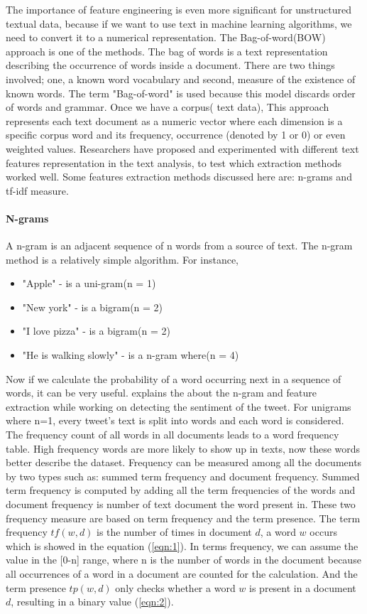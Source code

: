 The importance of feature engineering is even more significant for unstructured textual data, because if we want to use text in machine learning algorithms, we need to convert it to a numerical representation. The Bag-of-word(BOW) approach is one of the methods. The bag of words is a text representation describing the occurrence of words inside a document. There are two things involved; one, a known word vocabulary and second, measure of the existence of known words. The term "Bag-of-word" is used because this model discards order of words and grammar.  Once we have a corpus( text data), This approach represents each text document as a numeric vector where each dimension is a specific corpus word and its frequency, occurrence (denoted by 1 or 0) or even weighted values. Researchers have proposed and experimented with different text features representation in the text analysis, to test which extraction methods worked well. Some features extraction methods discussed here are:  n-grams and tf-idf measure.

\paragraph{N-grams} 


A n-gram is an adjacent sequence of n words from a source of text. The n-gram method is a relatively simple algorithm. For instance, 
\begin{itemize}
  \item "Apple" - is a uni-gram(n = 1)
  \item "New york" - is a bigram(n = 2)
  \item "I love pizza" - is a bigram(n = 2)
  \item "He is walking slowly" - is a n-gram where(n = 4)
\end{itemize}
Now if we calculate the probability of a word occurring next in a sequence of words, it can be very useful. \cite{groot2012data} explains the about the n-gram and feature extraction while working on detecting the sentiment of the tweet. For unigrams where n=1, every tweet's text is split into words and each word is considered. The frequency count of all words in all documents leads to a word frequency table. High frequency words are more likely to show up in texts, now these words better describe the dataset. Frequency can be measured among all the documents by two types such as: summed term frequency and document frequency. Summed term frequency is computed by adding all the term frequencies of the words and document frequency is number of text document the word present in. These two frequency measure are based on term frequency and the term presence. The term frequency $tf(w,d)$ is the number of times in document $d$, a word $w$ occurs which is showed in the equation (\ref{eqn:1}). In terms frequency, we can assume the value in the [0-n] range, where n is the number of words in the document because all occurrences of a word in a document are counted for the calculation. And the term presence $tp(w,d)$ only checks whether a word $w$ is present in a document $d$, resulting in a binary value (\ref{eqn:2}).

